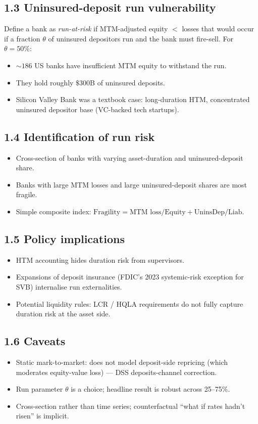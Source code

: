 \documentclass[11pt]{article}
\begin{document}
\subsection*{1.3 Uninsured-deposit run vulnerability}
Define a bank as \emph{run-at-risk} if MTM-adjusted equity $<$ losses that would occur if a fraction $\theta$ of uninsured depositors run and the bank must fire-sell. For $\theta=50\%$:
\begin{itemize}
\item $\sim 186$ US banks have insufficient MTM equity to withstand the run.
\item They hold roughly $\$300$B of uninsured deposits.
\item Silicon Valley Bank was a textbook case: long-duration HTM, concentrated uninsured depositor base (VC-backed tech startups).
\end{itemize}

\subsection*{1.4 Identification of run risk}
\begin{itemize}
\item Cross-section of banks with varying asset-duration and uninsured-deposit share.
\item Banks with large MTM losses and large uninsured-deposit shares are most fragile.
\item Simple composite index: $\text{Fragility} = \text{MTM loss} / \text{Equity} + \text{UninsDep} / \text{Liab}$.
\end{itemize}

\subsection*{1.5 Policy implications}
\begin{itemize}
\item HTM accounting hides duration risk from supervisors.
\item Expansions of deposit insurance (FDIC's 2023 systemic-risk exception for SVB) internalise run externalities.
\item Potential liquidity rules: LCR / HQLA requirements do not fully capture duration risk at the asset side.
\end{itemize}

\subsection*{1.6 Caveats}
\begin{alertbox}
\begin{itemize}
\item Static mark-to-market: does not model deposit-side repricing (which moderates equity-value loss) --- DSS deposits-channel correction.
\item Run parameter $\theta$ is a choice; headline result is robust across 25--75\%.
\item Cross-section rather than time series; counterfactual ``what if rates hadn't risen'' is implicit.
\end{itemize}
\end{alertbox}
\end{document}
